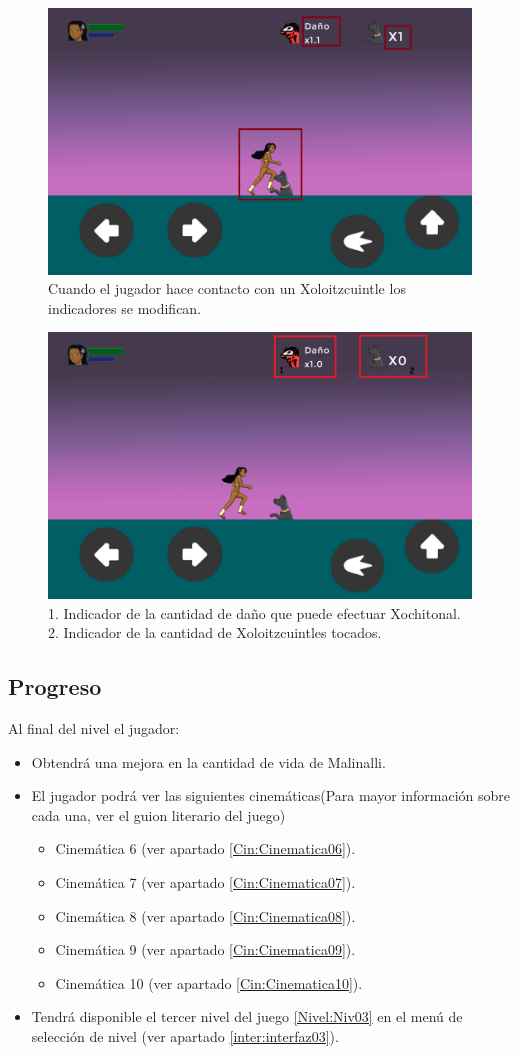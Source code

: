 \begin{figure}
  \centering
   \includegraphics[width=0.4 \textwidth]{Imagenes/nivel02_xoloContacto}
  \caption{Cuando el jugador hace contacto con un Xoloitzcuintle los indicadores se modifican.}
  \label{fig:InterNivel2}
\end{figure} 

\begin{figure}
  \centering
   \includegraphics[width=0.4 \textwidth]{Imagenes/nivel02_xolo}
  \caption{1. Indicador de la cantidad de daño que puede efectuar Xochitonal. 2. Indicador de la cantidad de Xoloitzcuintles tocados.}
  \label{fig:GUICtrlNivel2}
\end{figure} 



	\subsection{Progreso}
Al final del nivel el jugador:
\begin{itemize}
	\item Obtendrá una mejora en la cantidad de vida de Malinalli.
	\item El jugador podrá ver las siguientes cinemáticas(Para mayor información sobre cada una, ver el guion literario del juego)
		\begin{itemize}
			\item Cinemática 6 (ver apartado \ref{Cin:Cinematica06}).
			\item Cinemática 7 (ver apartado \ref{Cin:Cinematica07}).
			\item Cinemática 8 (ver apartado \ref{Cin:Cinematica08}).
			\item Cinemática 9 (ver apartado \ref{Cin:Cinematica09}).
			\item Cinemática 10 (ver apartado \ref{Cin:Cinematica10}).
		\end{itemize}
	\item Tendrá disponible el tercer nivel del juego \ref{Nivel:Niv03} en el menú de selección de nivel (ver apartado \ref{inter:interfaz03}). 
\end{itemize}
